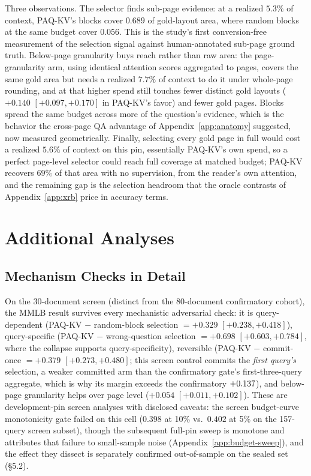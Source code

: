 \documentclass[letterpaper]{article} %
\newcommand{\paqc}{\textsc{PAQ-KV}}
\begin{document}
Three observations. The selector finds sub-page evidence: at a realized
$5.3\%$ of context, \paqc{}'s blocks cover $0.689$ of gold-layout area, where
random blocks at the same budget cover $0.056$. This is the study's first
conversion-free measurement of the selection signal against human-annotated
sub-page ground truth. Below-page granularity buys reach rather than raw
area: the page-granularity arm, using identical attention scores aggregated
to pages, covers the same gold area but needs a realized $7.7\%$ of context
to do it under whole-page rounding, and at that higher spend still touches
fewer distinct gold layouts ($+0.140$ $[+0.097,+0.170]$ in \paqc{}'s favor)
and fewer gold pages. Blocks spread the same budget across more of the
question's evidence, which is the behavior the cross-page QA advantage of
Appendix~\ref{app:anatomy} suggested, now measured geometrically. Finally,
selecting every gold page in full would cost a realized $5.6\%$ of context on
this pin, essentially \paqc{}'s own spend, so a perfect page-level selector
could reach full coverage at matched budget; \paqc{} recovers $69\%$ of that
area with no supervision, from the reader's own attention, and the remaining
gap is the selection headroom that the oracle contrasts of
Appendix~\ref{app:xrb} price in accuracy terms.

\section{Additional Analyses}\label{app:analyses}

\subsection{Mechanism Checks in Detail}\label{app:mechanism}

On the 30-document screen (distinct from the 80-document confirmatory
cohort), the MMLB result survives every mechanistic adversarial
check: it is query-dependent (\paqc{} $-$ random-block selection $= +0.329$
$[+0.238,+0.418]$), query-specific (\paqc{} $-$ wrong-question selection $=
+0.698$ $[+0.603,+0.784]$, where the collapse supports query-specificity),
reversible (\paqc{} $-$ commit-once $= +0.379$ $[+0.273,+0.480]$; this
screen control commits the \emph{first query's} selection, a weaker
committed arm than the confirmatory gate's first-three-query aggregate,
which is why its margin exceeds the confirmatory $+0.137$), and
below-page granularity helps over page level ($+0.054$ $[+0.011,+0.102]$).
These are development-pin screen analyses with disclosed caveats: the screen
budget-curve monotonicity gate failed on this cell ($0.398$ at 10\% vs.\
$0.402$ at 5\% on the 157-query screen subset), though the subsequent
full-pin sweep is monotone and attributes that failure to small-sample noise
(Appendix~\ref{app:budget-sweep}), and the effect they dissect is separately
confirmed out-of-sample on the sealed set (\S5.2).
\end{document}
